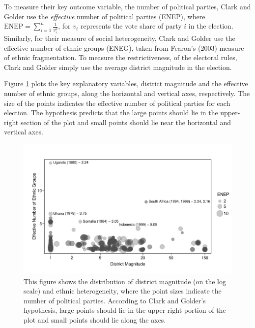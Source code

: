\documentclass[12pt]{article}
\begin{document}
To measure their key outcome variable, the number of political parties, Clark and Golder use the \textit{effective} number of political parties (ENEP), where $\text{ENEP} = \sum_{i = 1}^n\frac{1}{v_i^2}$, for $v_i$ represents the vote share of party $i$ in the election. Similarly, for their measure of social heterogeneity, Clark and Golder use the effective number of ethnic groups (ENEG), taken from Fearon's (2003) measure of ethnic fragmentation. To measure the restrictiveness, of the electoral rules, Clark and Golder simply use the average district magnitude in the election. 

Figure \ref{fig:cg-scatter} plots the key explanatory variables, district magnitude and the effective number of ethnic groups, along the horizontal and vertical axes, respectively. The size of the points indicates the effective number of political parties for each election. The hypothesis predicts that the large points should lie in the upper-right section of the plot and small points should lie near the horizontal and vertical axes.

\begin{figure}[H]
\begin{center}
\includegraphics[scale = 0.8]{figs/cg-scatter.pdf}
\caption{This figure shows the distribution of district magnitude (on the log scale) and ethnic heterogeneity, where the point sizes indicate the number of political parties. According to Clark and Golder's hypothesis, large points should lie in the upper-right portion of the plot and small points should lie along the axes.}\label{fig:cg-scatter}
\end{center}
\end{figure}
\end{document}
